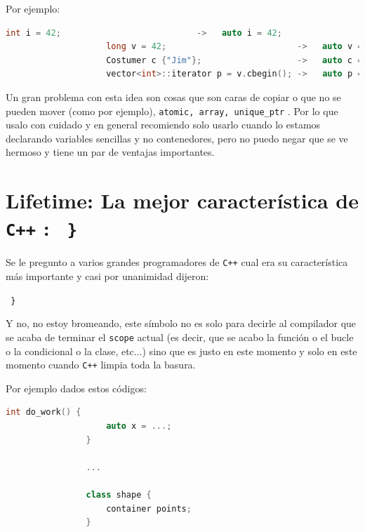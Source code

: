 \documentclass[12pt, fleqn]{report}                             %
\theoremstyle{break}                                            %
\newcommand{\textCode}[1]  { \texttt{#1} }                      %
\newcommand{\Cpp}{\ignorespaces\textCode{C++}}                  %
\begin{document}
                Por ejemplo:
                \begin{lstlisting}[language=C++, gobble=20]
                    int i = 42;                           ->   auto i = 42;
                    long v = 42;                          ->   auto v = long {42};
                    Costumer c {"Jim"};                   ->   auto c = Costumer {"Jim"};
                    vector<int>::iterator p = v.cbegin(); ->   auto p = v.cbegin();
                \end{lstlisting}

                Un gran problema con esta idea son cosas que son caras de copiar o que no se pueden mover
                (como por ejemplo), \textCode{atomic, array, unique\_ptr}. Por lo que usalo con cuidado
                y en general recomiendo solo usarlo cuando lo estamos declarando variables sencillas y no 
                contenedores, pero no puedo negar que se ve hermoso y tiene un par de ventajas importantes.

            
        \clearpage
        \section{Lifetime: La mejor característica de \Cpp: \textCode{ \} } }     
        
            Se le pregunto a varios grandes programadores de \Cpp cual era su
            característica más importante y casi por unanimidad dijeron:

            \textCode{ \} }

            Y no, no estoy bromeando, este símbolo no es solo para decirle al compilador
            que se acaba de terminar el \textCode{scope} actual (es decir, que se acabo 
            la función o el bucle o la condicional o la clase, etc...) sino que es justo
            en este momento y solo en este momento cuando \Cpp limpia toda la basura.

            Por ejemplo dados estos códigos:
            \begin{lstlisting}[language=C++, gobble=16]
                int do_work() {
                    auto x = ...;
                }

                ...

                class shape {
                    container points;
                }
            \end{lstlisting}
\end{document}
